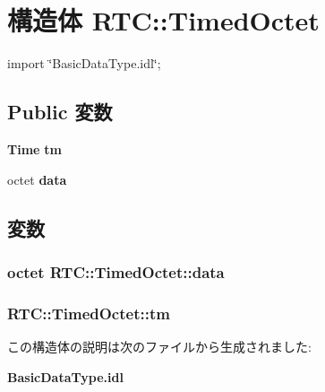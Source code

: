 \section{構造体 RTC::TimedOctet}
\label{structRTC_1_1TimedOctet}


{\ttfamily import \char`\"{}BasicDataType.idl\char`\"{};}

\subsection*{Public 変数}
\begin{DoxyCompactItemize}
\item 
{\bf Time} {\bf tm}
\item 
octet {\bf data}
\end{DoxyCompactItemize}


\subsection{変数}
\subsubsection[{data}]{\setlength{\rightskip}{0pt plus 5cm}octet {\bf RTC::TimedOctet::data}}\label{structRTC_1_1TimedOctet_a6c45f3d01d9f4c3aca20d7f7172cae1d}
\subsubsection[{tm}]{ {\bf RTC::TimedOctet::tm}}\label{structRTC_1_1TimedOctet_af92156b9d60619de75dce6b68c78ca71}


この構造体の説明は次のファイルから生成されました:\begin{DoxyCompactItemize}
\item 
{\bf BasicDataType.idl}\end{DoxyCompactItemize}
